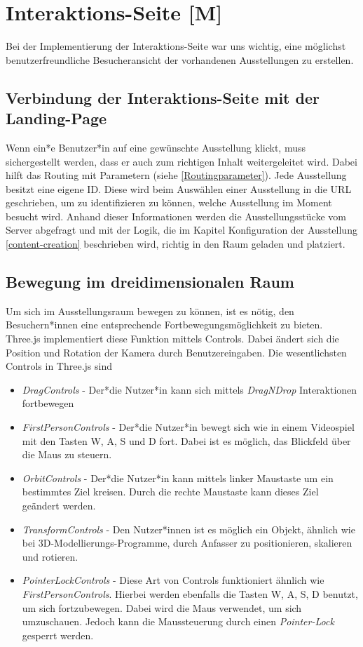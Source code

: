 \section{Interaktions-Seite [M]}

Bei der Implementierung der Interaktions-Seite war uns wichtig, eine möglichst benutzerfreundliche Besucheransicht der vorhandenen Ausstellungen zu erstellen. 

\subsection{Verbindung der Interaktions-Seite mit der Landing-Page
}
Wenn ein*e Benutzer*in auf eine gewünschte Ausstellung klickt, muss sichergestellt werden, dass er auch zum richtigen Inhalt weitergeleitet wird. Dabei hilft das Routing mit Parametern (siehe \ref{Routingparameter}). Jede Ausstellung besitzt eine eigene ID. Diese wird beim Auswählen einer Ausstellung in die URL geschrieben, um zu identifizieren zu können, welche Ausstellung im Moment besucht wird. Anhand dieser Informationen werden die Ausstellungsstücke vom Server abgefragt und mit der Logik, die im Kapitel Konfiguration der Ausstellung \ref{content-creation} beschrieben wird, richtig in den Raum geladen und platziert.

\subsection{Bewegung im dreidimensionalen Raum}
\label{controls}
Um sich im Ausstellungsraum bewegen zu können, ist es nötig, den Besuchern*innen eine entsprechende Fortbewegungsmöglichkeit zu bieten. Three.js implementiert diese Funktion mittels Controls. Dabei ändert sich die Position und Rotation der Kamera durch Benutzereingaben. Die wesentlichsten Controls in Three.js sind

\begin{itemize}
    \item \emph{DragControls} - Der*die Nutzer*in kann sich mittels \emph{DragNDrop} Interaktionen fortbewegen \cite{DragControls}
    \item \emph{FirstPersonControls} - Der*die Nutzer*in bewegt sich wie in einem Videospiel mit den Tasten W, A, S und D fort. Dabei ist es möglich, das Blickfeld über die Maus zu steuern. \cite{FirstPersonControls}
    \item \emph{OrbitControls} - Der*die Nutzer*in kann mittels linker Maustaste um ein bestimmtes Ziel kreisen. Durch die rechte Maustaste kann dieses Ziel geändert werden. \cite{OrbitControls}
    \item \emph{TransformControls} - Den Nutzer*innen ist es möglich ein Objekt, ähnlich wie bei 3D-Modellierungs-Programme, durch Anfasser zu positionieren, skalieren und rotieren. \cite{TransformControls}
    \item \emph{PointerLockControls} - Diese Art von Controls funktioniert ähnlich wie \emph{FirstPersonControls}. Hierbei werden ebenfalls die Tasten W, A, S, D benutzt, um sich fortzubewegen. Dabei wird die Maus verwendet, um sich umzuschauen. Jedoch kann die Maussteuerung durch einen \emph{Pointer-Lock} gesperrt werden.\cite{PointerLockControls}
\end{itemize}


